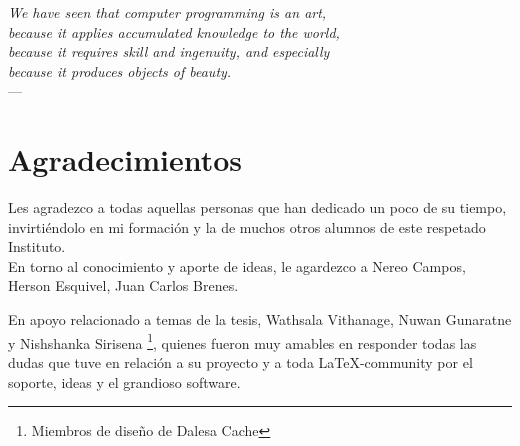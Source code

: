 

\begin{flushright}{\slshape    
We have seen that computer programming is an art, \\ 
because it applies accumulated knowledge to the world, \\ 
because it requires skill and ingenuity, and especially \\
because it produces objects of beauty.} \\ \medskip
---  \citep{knuth:1974}
\end{flushright}

\bigskip


\begingroup

\let\clearpage\relax
\let\cleardoublepage\relax
\let\cleardoublepage\relax

\chapter*{Agradecimientos} %

\noindent Les agradezco a todas aquellas personas que han dedicado un poco de su tiempo, invirtiéndolo en mi formación y la de muchos otros alumnos de este respetado Instituto.\\

\noindent En torno al conocimiento y aporte de ideas, le agardezco a Nereo Campos, Herson Esquivel, Juan Carlos Brenes. 

\noindent En apoyo relacionado a temas de la tesis, Wathsala Vithanage, Nuwan Gunaratne y Nishshanka Sirisena \footnote{Miembros de diseño de Dalesa Cache}, quienes fueron muy amables en responder todas las dudas que tuve en relación a su proyecto  y a toda \LaTeX-community por el soporte, ideas y el grandioso software.



\endgroup